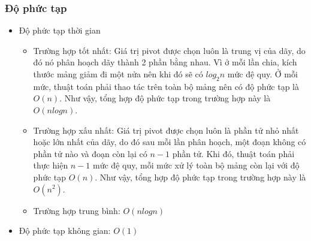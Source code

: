 
\subsubsection{Độ phức tạp}

\begin{itemize}
    \item Độ phức tạp thời gian
    \begin{itemize}[label=$\circ$]
        \item Trường hợp tốt nhất: Giá trị pivot được chọn luôn là trung vị của dãy, do đó nó phân hoạch dãy thành 2 phần bằng nhau. Vì ở mỗi lần chia, kích thước mảng giảm đi một nửa nên khi đó sẽ có $log_2{n}$ mức đệ quy. Ở mỗi mức, thuật toán phải thao tác trên toàn bộ mảng nên có độ phức tạp là $O(n)$. Như vậy, tổng hợp độ phức tạp trong trường hợp này là $O(nlogn)$.
        
        \item Trường hợp xấu nhất: Giá trị pivot được chọn luôn là phần tử nhỏ nhất hoặc lớn nhất của dãy, do đó sau mỗi lần phân hoạch, một đoạn không có phần tử nào và đoạn còn lại có $n - 1$ phần tử. Khi đó, thuật toán phải thực hiện  $n - 1$ mức đệ quy, mỗi mức xử lý toàn bộ mảng còn lại với độ phức tạp $O(n)$. Như vậy, tổng hợp độ phức tạp trong trường hợp này là $O(n^2)$.
        
        \item Trường hợp trung bình: $O(nlogn)$ 
    \end{itemize}
    
    \item Độ phức tạp không gian: $O(1)$
\end{itemize}